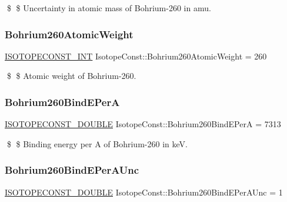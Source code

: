 \$ \$ Uncertainty in atomic mass of Bohrium-\/260 in amu. \mbox{\label{group___isotope_const-_bohrium-_bh260_gad43f28a1990ef70ff456b08e4a07bb91}} 
\subsubsection{\texorpdfstring{Bohrium260\+Atomic\+Weight}{Bohrium260AtomicWeight}}
{\footnotesize\ttfamily \mbox{\hyperlink{group___isotope_const-_macros_ga5f18360b3e99483a35c32d789e62621c}{I\+S\+O\+T\+O\+P\+E\+C\+O\+N\+S\+T\+\_\+\+I\+NT}} Isotope\+Const\+::\+Bohrium260\+Atomic\+Weight = 260}

\$ \$ Atomic weight of Bohrium-\/260. \mbox{\label{group___isotope_const-_bohrium-_bh260_gac0bc489fd68de80cb395552a801d6237}} 
\subsubsection{\texorpdfstring{Bohrium260\+Bind\+E\+PerA}{Bohrium260BindEPerA}}
{\footnotesize\ttfamily \mbox{\hyperlink{group___isotope_const-_macros_ga8f45a7272ce02c0b4c65c44636ed719a}{I\+S\+O\+T\+O\+P\+E\+C\+O\+N\+S\+T\+\_\+\+D\+O\+U\+B\+LE}} Isotope\+Const\+::\+Bohrium260\+Bind\+E\+PerA = 7313}

\$ \$ Binding energy per A of Bohrium-\/260 in keV. \mbox{\label{group___isotope_const-_bohrium-_bh260_ga0c7e43ac6635ae00492e88fb01de41ce}} 
\subsubsection{\texorpdfstring{Bohrium260\+Bind\+E\+Per\+A\+Unc}{Bohrium260BindEPerAUnc}}
{\footnotesize\ttfamily \mbox{\hyperlink{group___isotope_const-_macros_ga8f45a7272ce02c0b4c65c44636ed719a}{I\+S\+O\+T\+O\+P\+E\+C\+O\+N\+S\+T\+\_\+\+D\+O\+U\+B\+LE}} Isotope\+Const\+::\+Bohrium260\+Bind\+E\+Per\+A\+Unc = 1}

